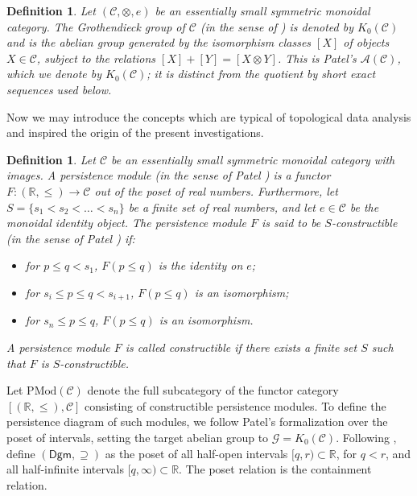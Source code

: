 \documentclass{amsart}
\newtheorem{definition}[theorem]{Definition}
\begin{document}
\begin{definition}
Let $(\mathcal{C}, \otimes, e)$ be an essentially small symmetric monoidal category. The Grothendieck group of $\mathcal{C}$ (in the sense of \cite[Definition~6.1.1, p.~406]{patel2016generalized}) is denoted  by $K_0(\mathcal{C})$ and is the abelian group generated by the isomorphism classes $[X]$ of objects $X \in \mathcal{C}$, subject to the relations $[X]+[Y]=[X\otimes Y]$. This is Patel's $\mathcal A(\mathcal C)$, which we denote by $K_0(\mathcal C)$; it is distinct from the quotient by short exact sequences used below.
\end{definition}

Now we may introduce the concepts which are typical of topological data analysis and inspired the origin of the present investigations.

\begin{definition}
Let $\mathcal{C}$ be an essentially small symmetric monoidal category with images. A persistence module (in the sense of Patel \cite[Definition~2.1]{patel2016generalized}) is a functor $F \colon (\mathbb{R}, \leq) \to \mathcal{C}$ out of the poset of real numbers.
Furthermore, let $S = \{s_1 < s_2 < \dots < s_n\}$ be a finite set of real numbers, and let $e \in \mathcal{C}$ be the monoidal identity object. The persistence module $F$ is said to be \textit{$S$-constructible} (in the sense of Patel \cite[Definition~2.2]{patel2016generalized}) if:
\begin{itemize}
    \item for $p \leq q < s_1$, $F(p \leq q)$ is the identity on $e$;
    \item for $s_i \leq p \leq q < s_{i+1}$, $F(p \leq q)$ is an isomorphism;
    \item for $s_n \leq p \leq q$, $F(p \leq q)$ is an isomorphism.
\end{itemize}
A persistence module $F$ is called \textit{constructible} if there exists a finite set $S$ such that $F$ is $S$-constructible.
\end{definition}

Let $\mathrm{PMod}(\mathcal{C})$ denote the full subcategory of the functor category $[(\mathbb{R}, \le), \mathcal{C}]$ consisting of constructible persistence modules. To define the persistence diagram of such modules, we follow Patel's formalization over the poset of intervals, setting the target abelian group to $\mathcal{G} = K_0(\mathcal{C})$.
Following \cite[Definition~4.1]{patel2016generalized}, define $(\mathsf{Dgm}, \supseteq)$ as the poset of all half-open intervals $[q, r) \subset \mathbb{R}$, for $q < r$, and all half-infinite intervals $[q, \infty) \subset \mathbb{R}$. The poset relation is the containment relation.
\end{document}
